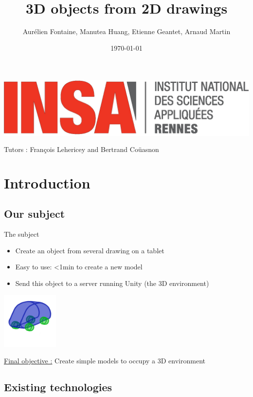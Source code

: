 \documentclass[a4paper,10pt]{beamer}
\title{3D objects from 2D drawings}
\author[Groupe 3INFO]{Aurélien Fontaine, Manutea Huang, Etienne Geantet, Arnaud Martin}
\institute[INSA de Rennes]{Institut National des Sciences Appliquées de Rennes}
\date{\today}
\begin{document}
	
	\begin{frame}
		\begin{titlepage}
			\centerline{\includegraphics[scale=0.1]{images/logos/logoINSA.jpg}}
			\centerline{Tutors : François Lehericey and Bertrand Coüasnon}	
		\end{titlepage}
	\end{frame}

	\section{Introduction}

		
		\subsection{Our subject}
		
		\begin{frame}{The subject}
			\begin{itemize}
				\item Create an object from several drawing on a tablet
				\item Easy to use: <1min to create a new model
				\item Send this object to a server running Unity (the 3D environment)
			\end{itemize}
			\centerline{\includegraphics[height=80pt]{images/modelcar.png}}              
			\underline{Final objective :} Create simple models to occupy a 3D environment
		\end{frame}
		
			
	\begin{frame}
		\tableofcontents
	\end{frame}
			
				\subsection{Existing technologies}
		
\end{document}
